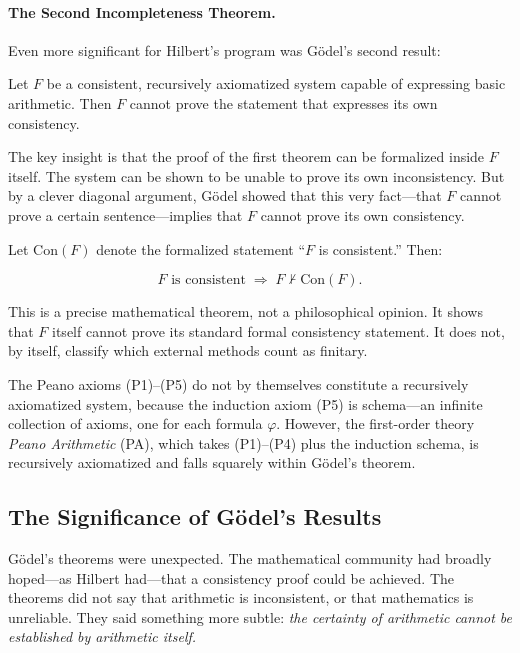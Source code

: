 \paragraph{The Second Incompleteness Theorem.}

Even more significant for Hilbert's program was G\"odel's second result:

\begin{theorem}
\label{thm:godel-second}
Let $F$ be a consistent, recursively axiomatized system capable of expressing basic arithmetic. Then $F$ cannot prove the statement that expresses its own consistency.
\end{theorem}

The key insight is that the proof of the first theorem can be formalized inside $F$ itself. The system can be shown to be unable to prove its own inconsistency. But by a clever diagonal argument, G\"odel showed that this very fact---that $F$ cannot prove a certain sentence---implies that $F$ cannot prove its own consistency.

Let $\mathrm{Con}(F)$ denote the formalized statement ``$F$ is consistent.'' Then:

\[
    F \text{ is consistent} \;\Longrightarrow\; F \nvdash \mathrm{Con}(F).
\]

This is a precise mathematical theorem, not a philosophical opinion. It shows that $F$ itself cannot prove its standard formal consistency statement. It does not, by itself, classify which external methods count as finitary.

\begin{remark}
The Peano axioms (P1)--(P5) do not by themselves constitute a recursively axiomatized system, because the induction axiom (P5) is schema---an infinite collection of axioms, one for each formula $\varphi$. However, the first-order theory \emph{Peano Arithmetic} (PA), which takes (P1)--(P4) plus the induction schema, is recursively axiomatized and falls squarely within G\"odel's theorem.
\end{remark}

\subsection{The Significance of G\"odel's Results}

G\"odel's theorems were unexpected. The mathematical community had broadly hoped---as Hilbert had---that a consistency proof could be achieved. The theorems did not say that arithmetic is inconsistent, or that mathematics is unreliable. They said something more subtle: \emph{the certainty of arithmetic cannot be established by arithmetic itself.}

